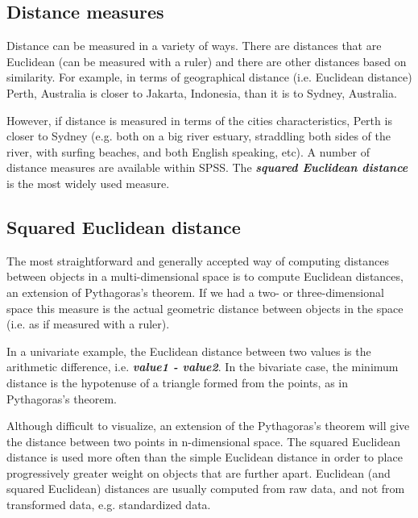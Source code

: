 \subsection{Distance measures}
Distance can be measured in a variety of ways. There are distances that are Euclidean (can be measured with a ruler) and there are other distances based on similarity. For example, in terms of
geographical distance (i.e. Euclidean distance) Perth, Australia is closer to Jakarta, Indonesia, than it is to Sydney, Australia.

However, if distance is measured in terms of the cities characteristics, Perth is closer to Sydney (e.g. both on a big river estuary, straddling both sides of the river, with surfing beaches, and both English speaking, etc). A number of distance measures are available within SPSS. The \textbf{\textit{squared Euclidean distance}} is the most widely used measure.

\subsection{Squared Euclidean distance}

The most straightforward and generally accepted way of computing distances between objects in a multi-dimensional space is to compute Euclidean distances, an extension of Pythagoras's theorem.
If we had a two- or three-dimensional space this measure is the actual geometric distance between objects in the space (i.e. as if measured with a ruler).

In a univariate example, the Euclidean distance between two values is the arithmetic difference, i.e. \textbf{\textit{value1 - value2}}. In the bivariate case, the minimum distance is the hypotenuse of a triangle formed from the points, as in Pythagoras's theorem.

Although difficult to visualize, an extension of the Pythagoras's theorem will give the distance between two points in n-dimensional space. The squared Euclidean distance is used more often than the simple Euclidean distance in order to place progressively greater weight on objects that are further apart. Euclidean (and squared Euclidean) distances are usually computed from raw data, and not from transformed data, e.g. standardized data.
\newpage
